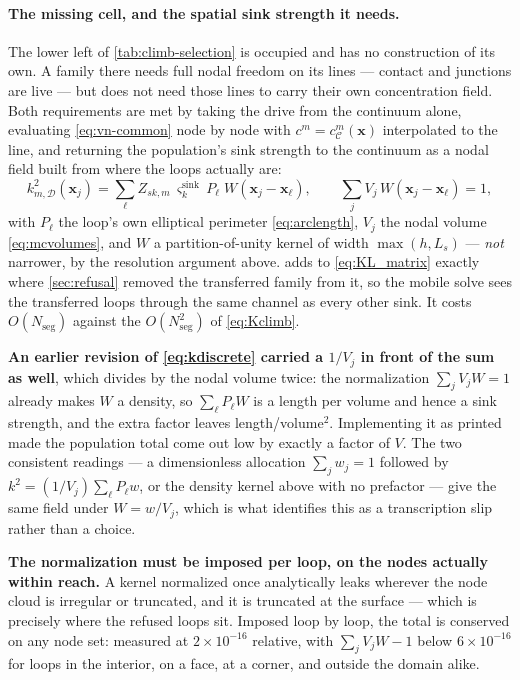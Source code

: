 \documentclass{article}
\begin{document}
\paragraph{The missing cell, and the spatial sink strength it needs.} The lower
left of \cref{tab:climb-selection} is occupied and has no construction of its
own. A family there needs full nodal freedom on its lines --- contact and
junctions are live --- but does not need those lines to carry their own
concentration field. Both requirements are met by taking the drive from the
continuum alone, evaluating \cref{eq:vn-common} node by node with
$c^m=c^m_{\mathcal C}(\bm x)$ interpolated to the line, and returning the
population's sink strength to the continuum as a nodal field built from where the
loops actually are:
\begin{equation}
  k^{2}_{m,\mathcal D}(\bm x_j)
   =\sum_{\ell}Z_{sk,m}\,\varsigma^{\mathrm{sink}}_k\,
     P_\ell\;W\!\left(\bm x_j-\bm x_\ell\right),
  \qquad
  \sum_j V_j\,W(\bm x_j-\bm x_\ell)=1,
  \label{eq:kdiscrete}
\end{equation}
with $P_\ell$ the loop's own elliptical perimeter \cref{eq:arclength}, $V_j$ the
nodal volume \cref{eq:mcvolumes}, and $W$ a partition-of-unity kernel of width
$\max(h,L_s)$ --- \emph{not} narrower, by the resolution argument above.
 adds to \cref{eq:KL_matrix} exactly where
\cref{sec:refusal} removed the transferred family from it, so the mobile solve
sees the transferred loops through the same channel as every other sink. It costs
$O(N_{\mathrm{seg}})$ against the $O(N_{\mathrm{seg}}^{2})$ of \cref{eq:Kclimb}.

\textbf{An earlier revision of \cref{eq:kdiscrete} carried a $1/V_j$ in front of
the sum as well}, which divides by the nodal volume twice: the normalization
$\sum_jV_jW=1$ already makes $W$ a density, so $\sum_\ell P_\ell W$ is a length
per volume and hence a sink strength, and the extra factor leaves
length/volume$^2$. Implementing it as printed made the population total come out
low by exactly a factor of $V$. The two consistent readings --- a dimensionless
allocation $\sum_jw_j=1$ followed by $k^2=(1/V_j)\sum_\ell P_\ell w$, or the
density kernel above with no prefactor --- give the same field under $W=w/V_j$,
which is what identifies this as a transcription slip rather than a choice.

\textbf{The normalization must be imposed per loop, on the nodes actually within
reach.} A kernel normalized once analytically leaks wherever the node cloud is
irregular or truncated, and it is truncated at the surface --- which is precisely
where the refused loops sit. Imposed loop by loop, the total is conserved on any
node set: measured at $2\times10^{-16}$ relative, with $\sum_jV_jW-1$ below
$6\times10^{-16}$ for loops in the interior, on a face, at a corner, and outside
the domain alike.
\end{document}
